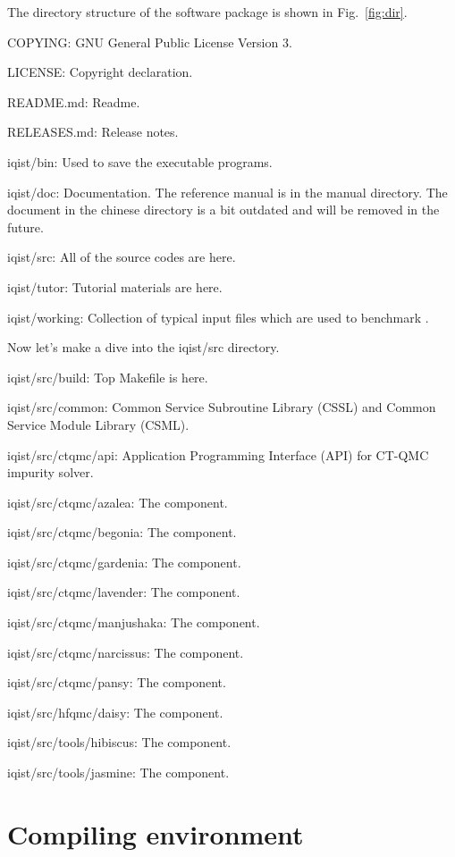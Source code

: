 The directory structure of the {\iqist} software package is shown in Fig.~\ref{fig:dir}.

COPYING: GNU General Public License Version 3.

LICENSE: Copyright declaration.

README.md: Readme.

RELEASES.md: Release notes.

iqist/bin: Used to save the executable programs.

iqist/doc: Documentation. The reference manual is in the manual directory. The document in the chinese directory is a bit outdated and will be removed in the future.

iqist/src: All of the source codes are here.

iqist/tutor: Tutorial materials are here.

iqist/working: Collection of typical input files which are used to benchmark {\iqist}.

Now let's make a dive into the iqist/src directory.

iqist/src/build: Top Makefile is here.

iqist/src/common: Common Service Subroutine Library (CSSL) and Common Service Module Library (CSML).

iqist/src/ctqmc/api: Application Programming Interface (API) for CT-QMC impurity solver.

iqist/src/ctqmc/azalea: The {\azalea} component.

iqist/src/ctqmc/begonia: The {\begonia} component.

iqist/src/ctqmc/gardenia: The {\gardenia} component.

iqist/src/ctqmc/lavender: The {\lavender} component.

iqist/src/ctqmc/manjushaka: The {\manjushaka} component.

iqist/src/ctqmc/narcissus: The {\narcissus} component.

iqist/src/ctqmc/pansy: The {\pansy} component.

iqist/src/hfqmc/daisy: The {\daisy} component.

iqist/src/tools/hibiscus: The {\hibiscus} component.

iqist/src/tools/jasmine: The {\jasmine} component.

\section{Compiling environment}

